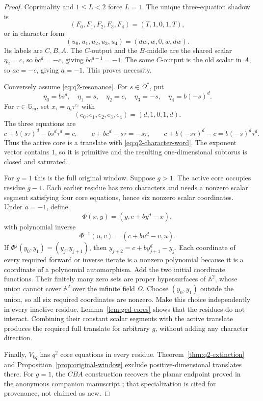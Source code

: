 \documentclass[11pt]{article}
\newcommand{\Gm}{\mathbb{G}_{\mathrm m}}
\newcommand{\A}{\mathbb{A}}
\newcommand{\Om}{\Omega}
\theoremstyle{remark}
\numberwithin{equation}{section}
\begin{document}
\begin{proof}
Coprimality and \(1\leq L<2\) force \(L=1\).  The unique three-equation shadow is
\[
 (F_0,F_1,F_2,F_3,F_4)=(T,1,0,1,T),
\]
or in character form
\begin{equation}\label{eq:q2-character-word}
 (u_0,u_1,u_2,u_3,u_4)=(dw,w,0,w,dw).
\end{equation}
Its labels are \(C,B,A\).  The \(C\)-output and the \(B\)-middle are the shared scalar \(\eta_2=c\), so \(bc^d=-c\), giving \(bc^{d-1}=-1\).  The same \(C\)-output is the old scalar in \(A\), so \(ac=-c\), giving \(a=-1\).  This proves necessity.

Conversely assume \eqref{eq:q2-resonance}.  For \(s\in\Om^\ast\), put
\begin{equation}\label{eq:q2-five-scalars}
 \eta_0=bs^d,\quad \eta_1=s,\quad \eta_2=c,\quad
 \eta_3=-s,\quad \eta_4=b(-s)^d.
\end{equation}
For \(\tau\in\Gm\), set \(x_i=\eta_i\tau^{e_i}\) with
\[
 (e_0,e_1,e_2,e_3,e_4)=(d,1,0,1,d).
\]
The three equations are
\[
 c+b(s\tau)^d-bs^d\tau^d=c,\qquad
 c+bc^d-s\tau=-s\tau,\qquad
 c+b(-s\tau)^d-c=b(-s)^d\tau^d.
\]
Thus the active core is a translate with \eqref{eq:q2-character-word}.  The exponent vector contains \(1\), so it is primitive and the resulting one-dimensional subtorus is closed and saturated.

For \(g=1\) this is the full original window.  Suppose \(g>1\).  The active core occupies residue \(g-1\).  Each earlier residue has zero characters and needs a nonzero scalar segment satisfying four core equations, hence six nonzero scalar coordinates.  Under \(a=-1\), define
\begin{equation}\label{eq:Phi}
 \Phi(x,y)=(y,c+by^d-x),
\end{equation}
with polynomial inverse
\begin{equation}\label{eq:Phi-inverse}
 \Phi^{-1}(u,v)=(c+bu^d-v,u).
\end{equation}
If \(\Phi^j(y_0,y_1)=(y_j,y_{j+1})\), then \(y_{j+2}=c+by_{j+1}^d-y_j\).  Each coordinate of every required forward or inverse iterate is a nonzero polynomial because it is a coordinate of a polynomial automorphism.  Add the two initial coordinate functions.  Their finitely many zero sets are proper hypersurfaces of \(\A^2\), whose union cannot cover \(\A^2\) over the infinite field \(\Om\).  Choose \((y_0,y_1)\) outside the union, so all six required coordinates are nonzero.  Make this choice independently in every inactive residue.  Lemma~\ref{lem:gcd-cores} shows that the residues do not interact.  Combining their constant scalar segments with the active translate produces the required full translate for arbitrary \(g\), without adding any character direction.

Finally, \(V_{kq}\) has \(q^2\) core equations in every residue.  Theorem~\ref{thm:q2-extinction} and Proposition~\ref{prop:original-window} exclude positive-dimensional translates there.  For \(g=1\), the \(CBA\) construction recovers the planar endpoint proved in the anonymous companion manuscript \citep{companionSupport}; that specialization is cited for provenance, not claimed as new.
\end{proof}
\end{document}
